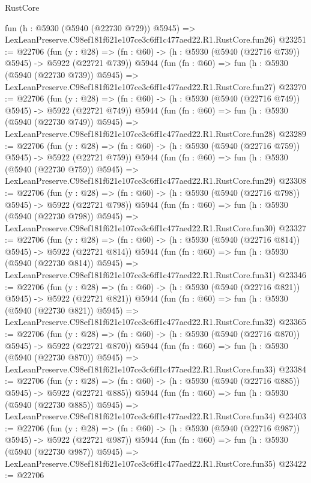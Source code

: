 \begin{lexlean}{RustCore}
\begin{coremodule}
    fun (h : @5930 (@5940 (@22730 @729)) @5945) =>
    LexLeanPreserve.C98ef181f621e107ce3c6ff1c477aed22.R1.RustCore.fun26)
@23251 := @22706
    (fun (y : @28) => (fn : @60) -> (h : @5930 (@5940 (@22716 @739)) @5945) -> @5922 (@22721 @739))
    @5944
    (fun (fn : @60) =>
    fun (h : @5930 (@5940 (@22730 @739)) @5945) =>
    LexLeanPreserve.C98ef181f621e107ce3c6ff1c477aed22.R1.RustCore.fun27)
@23270 := @22706
    (fun (y : @28) => (fn : @60) -> (h : @5930 (@5940 (@22716 @749)) @5945) -> @5922 (@22721 @749))
    @5944
    (fun (fn : @60) =>
    fun (h : @5930 (@5940 (@22730 @749)) @5945) =>
    LexLeanPreserve.C98ef181f621e107ce3c6ff1c477aed22.R1.RustCore.fun28)
@23289 := @22706
    (fun (y : @28) => (fn : @60) -> (h : @5930 (@5940 (@22716 @759)) @5945) -> @5922 (@22721 @759))
    @5944
    (fun (fn : @60) =>
    fun (h : @5930 (@5940 (@22730 @759)) @5945) =>
    LexLeanPreserve.C98ef181f621e107ce3c6ff1c477aed22.R1.RustCore.fun29)
@23308 := @22706
    (fun (y : @28) => (fn : @60) -> (h : @5930 (@5940 (@22716 @798)) @5945) -> @5922 (@22721 @798))
    @5944
    (fun (fn : @60) =>
    fun (h : @5930 (@5940 (@22730 @798)) @5945) =>
    LexLeanPreserve.C98ef181f621e107ce3c6ff1c477aed22.R1.RustCore.fun30)
@23327 := @22706
    (fun (y : @28) => (fn : @60) -> (h : @5930 (@5940 (@22716 @814)) @5945) -> @5922 (@22721 @814))
    @5944
    (fun (fn : @60) =>
    fun (h : @5930 (@5940 (@22730 @814)) @5945) =>
    LexLeanPreserve.C98ef181f621e107ce3c6ff1c477aed22.R1.RustCore.fun31)
@23346 := @22706
    (fun (y : @28) => (fn : @60) -> (h : @5930 (@5940 (@22716 @821)) @5945) -> @5922 (@22721 @821))
    @5944
    (fun (fn : @60) =>
    fun (h : @5930 (@5940 (@22730 @821)) @5945) =>
    LexLeanPreserve.C98ef181f621e107ce3c6ff1c477aed22.R1.RustCore.fun32)
@23365 := @22706
    (fun (y : @28) => (fn : @60) -> (h : @5930 (@5940 (@22716 @870)) @5945) -> @5922 (@22721 @870))
    @5944
    (fun (fn : @60) =>
    fun (h : @5930 (@5940 (@22730 @870)) @5945) =>
    LexLeanPreserve.C98ef181f621e107ce3c6ff1c477aed22.R1.RustCore.fun33)
@23384 := @22706
    (fun (y : @28) => (fn : @60) -> (h : @5930 (@5940 (@22716 @885)) @5945) -> @5922 (@22721 @885))
    @5944
    (fun (fn : @60) =>
    fun (h : @5930 (@5940 (@22730 @885)) @5945) =>
    LexLeanPreserve.C98ef181f621e107ce3c6ff1c477aed22.R1.RustCore.fun34)
@23403 := @22706
    (fun (y : @28) => (fn : @60) -> (h : @5930 (@5940 (@22716 @987)) @5945) -> @5922 (@22721 @987))
    @5944
    (fun (fn : @60) =>
    fun (h : @5930 (@5940 (@22730 @987)) @5945) =>
    LexLeanPreserve.C98ef181f621e107ce3c6ff1c477aed22.R1.RustCore.fun35)
@23422 := @22706

\end{coremodule}
\end{lexlean}
